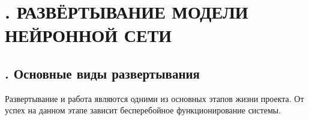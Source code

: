 \setcounter{chaptercntr}{5}

\sectionbreak \section*{
	\gostTitleFont
	\redline
	\thechaptercntr . 
	РАЗВЁРТЫВАНИЕ МОДЕЛИ НЕЙРОННОЙ СЕТИ
}
\subtitlespace

\subsection*{ 
	\gostTitleFont
	\redline
	\thechaptercntr .\thesubchaptercntr \spc
	Основные виды развертывания
} \addtocounter{subchaptercntr}{1}

\titlespace

{\gostFont
	
	\par \redline Развертывание и работа являются одними из основных этапов жизни проекта. От успех на данном этапе зависит бесперебойное функционирование системы.
	
}

